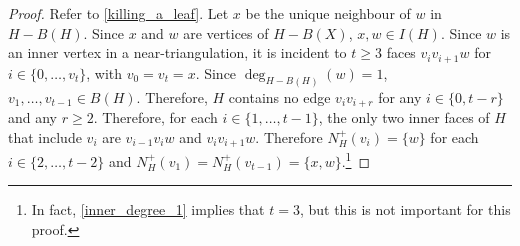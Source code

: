 \documentclass[12pt]{article}
\theoremstyle{definition}
\begin{document}
\begin{proof}
  Refer to \cref{killing_a_leaf}.
  Let $x$ be the unique neighbour of $w$ in $H-B(H)$. Since $x$ and $w$ are vertices of $H-B(X)$, $x,w\in I(H)$.  Since $w$ is an inner vertex in a near-triangulation, it is incident to $t\ge 3$ faces $v_iv_{i+1}w$ for $i\in\{0,\ldots,v_{t}\}$, with $v_0=v_t=x$.  Since $\deg_{H-B(H)}(w)=1$, $v_1,\ldots,v_{t-1}\in B(H)$.  Therefore, $H$ contains no edge $v_i v_{i+r}$ for any $i\in\{0,t-r\}$ and any $r\ge 2$.  Therefore, for each $i\in\{1,\ldots,t-1\}$, the only two inner faces of $H$ that include $v_i$ are $v_{i-1}v_iw$ and $v_iv_{i+1}w$.  Therefore $N^+_H(v_i)=\{w\}$ for each $i\in\{2,\ldots,t-2\}$ and $N^+_H(v_1)=N^+_H(v_{t-1})=\{x,w\}$.\footnote{In fact, \cref{inner_degree_1} implies that $t=3$, but this is not important for this proof.}


\end{proof}
\end{document}
